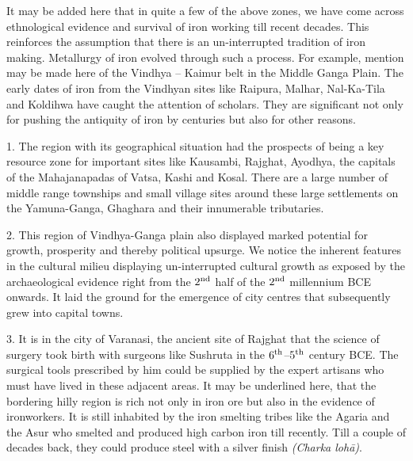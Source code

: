 It may be added here that in quite a few of the above zones, we have come across ethnological evidence and survival of iron working till recent decades. This reinforces the assumption that there is an un-interrupted tradition of iron making. Metallurgy of iron evolved through such a process. For example, mention may be made here of the Vindhya – Kaimur belt in the Middle Ganga Plain. The early dates of iron from the Vindhyan sites like Raipura, Malhar, Nal-Ka-Tila and Koldihwa have caught the attention of scholars. They are significant not only for pushing the antiquity of iron by centuries but also for other reasons.

1. The region with its geographical situation had the prospects of being a key resource zone for important sites like Kausambi, Rajghat, Ayodhya, the capitals of the Mahajanapadas of Vatsa, Kashi and Kosal. There are a large number of middle range townships and small village sites around these large settlements on the Yamuna-Ganga, Ghaghara and their innumerable tributaries.

2. This region of Vindhya-Ganga plain also displayed marked potential for growth, prosperity and thereby political upsurge. We notice the inherent features in the cultural milieu displaying un-interrupted cultural growth as exposed by the archaeological evidence right from the $2^{\rm nd}$ half of the $2^{\rm nd}$ millennium BCE onwards. It laid the ground for the emergence of city centres that subsequently grew into capital towns.

3. It is in the city of Varanasi, the ancient site of Rajghat that the science of surgery took birth with surgeons like Sushruta in the $6^{\rm th}$–$5^{\rm th}$ century BCE. The surgical tools prescribed by him could be supplied by the expert artisans who must have lived in these adjacent areas. It may be underlined here, that the bordering hilly region is rich not only in iron ore but also in the evidence of ironworkers. It is still inhabited by the iron smelting tribes like the Agaria and the Asur who smelted and produced high carbon iron till recently. Till a couple of decades back, they could produce steel with a silver finish \textit{(Charka lohā)}.

